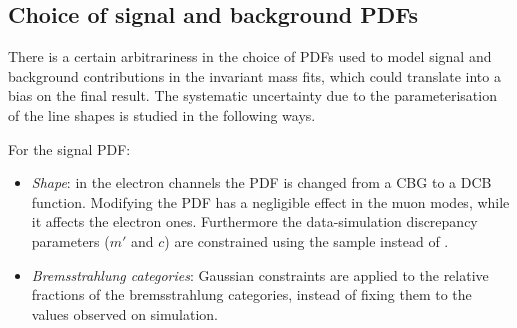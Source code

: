 \subsection{Choice of signal and background PDFs}

There is a certain arbitrariness in the choice of PDFs used to model signal and background contributions in the
invariant mass fits, which could translate into a bias on the final result. The systematic uncertainty due to the
parameterisation of the line shapes is studied in the following ways.

For the signal PDF:
%
\begin{itemize}

\item \textit{Shape}: in the electron channels the PDF is changed from a CBG to a DCB function.
Modifying the PDF has a negligible effect in the muon modes, while it affects the electron ones.
 Furthermore the data-simulation discrepancy parameters ($m'$ and $c$) are constrained using the
\BdToKstGee sample instead of \BdToKstJPsee.

\item \textit{Bremsstrahlung categories}: Gaussian constraints are applied to the relative fractions of 
the bremsstrahlung categories, instead of fixing them to the values observed on simulation.


\end{itemize}

